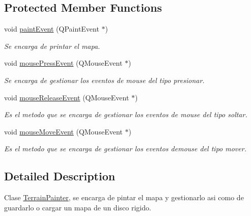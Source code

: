 \subsection*{Protected Member Functions}
\begin{DoxyCompactItemize}
\item 
void \hyperlink{class_terrain_painter_a7d7e2b12bea08e85c6bae73fb6490fc1}{paint\-Event} (Q\-Paint\-Event $\ast$)
\begin{DoxyCompactList}\small\item\em Se encarga de printar el mapa. \end{DoxyCompactList}\item 
void \hyperlink{class_terrain_painter_ac9cd048e8cf4f027f72fbdfef1366587}{mouse\-Press\-Event} (Q\-Mouse\-Event $\ast$)
\begin{DoxyCompactList}\small\item\em Se encarga de gestionar los eventos de mouse del tipo presionar. \end{DoxyCompactList}\item 
void \hyperlink{class_terrain_painter_a27691132e68fc91464eb87b7572958ec}{mouse\-Release\-Event} (Q\-Mouse\-Event $\ast$)
\begin{DoxyCompactList}\small\item\em Es el metodo que se encarga de gestionar los eventos de mouse del tipo soltar. \end{DoxyCompactList}\item 
void \hyperlink{class_terrain_painter_aee20f0d6985434efc6a1b2c0d1af3fc0}{mouse\-Move\-Event} (Q\-Mouse\-Event $\ast$)
\begin{DoxyCompactList}\small\item\em Es el metodo que se encarga de gestionar los eventos demouse del tipo mover. \end{DoxyCompactList}\end{DoxyCompactItemize}


\subsection{Detailed Description}
Clase \hyperlink{class_terrain_painter}{Terrain\-Painter}, se encarga de pintar el mapa y gestionarlo asi como de guardarlo o cargar un mapa de un disco rigido. 

